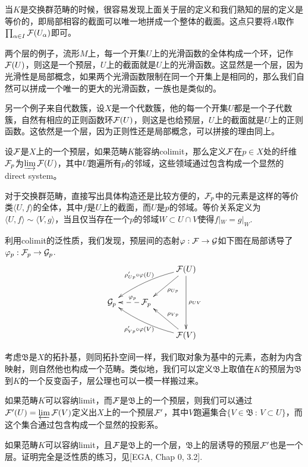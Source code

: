 \para 当$K$是交换群范畴的时候，很容易发现上面关于层的定义和我们熟知的层的定义是等价的，即局部相容的截面可以唯一地拼成一个整体的截面。这点只要将$A$取作$\prod_{\alpha\in I}\mathcal{F}(U_\alpha)$即可。

\para 两个层的例子，流形$M$上，每一个开集$U$上的光滑函数的全体构成一个环，记作$\mathcal{F}(U)$，则这是一个预层，$U$上的截面就是$U$上的光滑函数。这显然是一个层，因为光滑性是局部概念，如果两个光滑函数限制在同一个开集上是相同的，那么我们自然可以拼成一个唯一的更大的光滑函数，一族也是类似的。

另一个例子来自代数簇，设$X$是一个代数簇，他的每一个开集$U$都是一个子代数簇，自然有相应的正则函数环$\mathcal{F}(U)$，则这是也给预层，$U$上的截面就是$U$上的正则函数。这依然是一个层，因为正则性还是局部概念，可以拼接的理由同上。

\para 设$\mathcal{F}$是$X$上的一个预层，如果范畴$K$能容纳colimit，那么定义$\mathcal{F}$在$p\in X$处的纤维$\mathcal{F}_p$为$\varinjlim \mathcal{F}(U)$，其中$U$跑遍所有$p$的邻域，这些领域通过包含构成一个显然的direct system。

对于交换群范畴，直接写出具体构造还是比较方便的，$\mathcal{F}_p$中的元素是这样的等价类$\langle U,f\rangle$的全体，其中$f$是$U$上的截面，而$U$是$p$的邻域。等价关系定义为$\langle U,f\rangle\sim \langle V,g\rangle$，当且仅当存在一个$p$的邻域$W\subset U\cap V$使得$f|_W=g|_W$.

利用colimit的泛性质，我们发现，预层间的态射$\varphi:\mathcal{F}\to\mathcal{G}$如下图在局部诱导了$\varphi_p:\mathcal{F}_p\to\mathcal{G}_p$.
\[
	\xymatrix{
		&&\ar[dl]^{\rho_{Up}}\calf(U)\ar[dd]^{\rho_{UV}}\ar@/_/[lld]_{\rho'_{Up}\circ\varphi(U)} \\
		\calg_p&\ar@{-->}[l]_(0.4){\varphi_p}\calf_p&\\
		&&\ar[ul]_{\rho_{Vp}}\calf(V)\ar@/^/[llu]^{\rho'_{Vp}\circ\varphi(V)}
	}
\]

\para 考虑$\mathfrak{B}$是$X$的拓扑基，则同拓扑空间一样，我们取对象为基中的元素，态射为内含映射，则自然他也构成一个范畴。类似地，我们可以定义$\mathfrak{B}$上取值在$K$的预层为$\mathfrak{B}$到$K$的一个反变函子，层公理也可以一模一样搬过来。

如果范畴$K$可以容纳limit，而$\mathcal{F}$是$\mathfrak{B}$上的一个预层，则我们可以通过$\mathcal{F}'(U)=\varprojlim \mathcal{F}(V)$定义出$X$上的一个预层$\mathcal{F}'$，其中$V$跑遍集合$\{V\in \mathfrak{B}\,:\, V\subset U\}$，而这个集合通过包含构成一个显然的投影系。

\pro 如果范畴$K$可以容纳limit，且$\mathcal{F}$是$\mathfrak{B}$上的一个层，$\mathfrak{B}$上的层诱导的预层$\mathcal{F}'$也是一个层。证明完全是泛性质的练习，见[EGA, Chap 0, 3.2].

